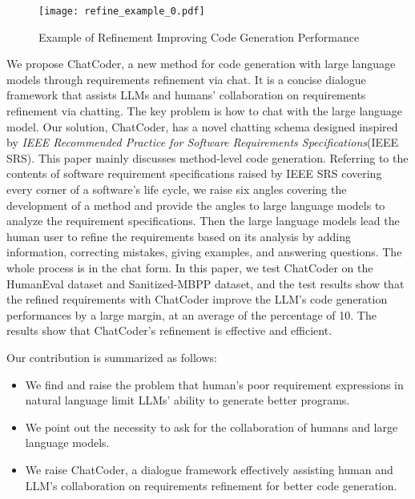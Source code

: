 \documentclass[sigconf]{acmart}
\begin{document}
\begin{figure*}[htbp]
    \centering
    \texttt{[image: refine\_example\_0.pdf]}
    \caption{Example of Refinement Improving Code Generation Performance}
    \label{fig:example_0}
\end{figure*}

We propose ChatCoder, a new method for code generation with large language models through requirements refinement via chat. It is a concise dialogue framework that assists LLMs and humans' collaboration on requirements refinement via chatting. The key problem is how to chat with the large language model. Our solution, ChatCoder, has a novel chatting schema designed inspired by \textit{IEEE Recommended Practice for Software Requirements Specifications}(IEEE SRS)\cite{ieee_re}. This paper mainly discusses method-level code generation. Referring to the contents of software requirement specifications raised by IEEE SRS covering every corner of a software's life cycle, we raise six angles covering the development of a method and provide the angles to large language models to analyze the requirement specifications. Then the large language models lead the human user to refine the requirements based on its analysis by adding information, correcting mistakes, giving examples, and answering questions. The whole process is in the chat form. In this paper, we test ChatCoder on the HumanEval dataset and Sanitized-MBPP dataset, and the test results show that the refined requirements with ChatCoder improve the LLM's code generation performances by a large margin, at an average of the percentage of 10. The results show that ChatCoder's refinement is effective and efficient.





Our contribution is summarized as follows:



\begin{itemize}
    \item We find and raise the problem that human's poor requirement expressions in natural language limit LLMs' ability to generate better programs.
    \item We point out the necessity to ask for the collaboration of humans and large language models.
    \item We raise ChatCoder, a dialogue framework effectively assisting human and LLM's collaboration on requirements refinement for better code generation.
\end{itemize}
\end{document}
